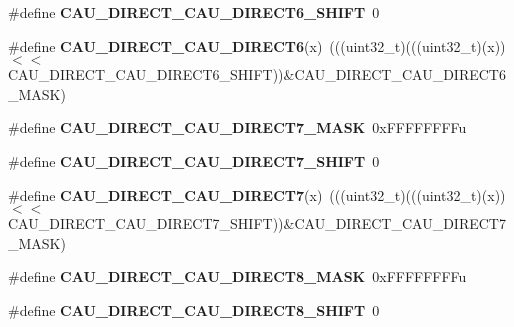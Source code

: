 \begin{DoxyCompactItemize}
\item 
\#define {\bfseries C\+A\+U\+\_\+\+D\+I\+R\+E\+C\+T\+\_\+\+C\+A\+U\+\_\+\+D\+I\+R\+E\+C\+T6\+\_\+\+S\+H\+I\+FT}~0\hypertarget{group__CAU__Register__Masks_ga4dea5b62b401604587b9fa6ed0d98f65}{}\label{group__CAU__Register__Masks_ga4dea5b62b401604587b9fa6ed0d98f65}

\item 
\#define {\bfseries C\+A\+U\+\_\+\+D\+I\+R\+E\+C\+T\+\_\+\+C\+A\+U\+\_\+\+D\+I\+R\+E\+C\+T6}(x)~(((uint32\+\_\+t)(((uint32\+\_\+t)(x))$<$$<$C\+A\+U\+\_\+\+D\+I\+R\+E\+C\+T\+\_\+\+C\+A\+U\+\_\+\+D\+I\+R\+E\+C\+T6\+\_\+\+S\+H\+I\+FT))\&C\+A\+U\+\_\+\+D\+I\+R\+E\+C\+T\+\_\+\+C\+A\+U\+\_\+\+D\+I\+R\+E\+C\+T6\+\_\+\+M\+A\+SK)\hypertarget{group__CAU__Register__Masks_gafd7a2e3e43805f32a2af9474502113b6}{}\label{group__CAU__Register__Masks_gafd7a2e3e43805f32a2af9474502113b6}

\item 
\#define {\bfseries C\+A\+U\+\_\+\+D\+I\+R\+E\+C\+T\+\_\+\+C\+A\+U\+\_\+\+D\+I\+R\+E\+C\+T7\+\_\+\+M\+A\+SK}~0x\+F\+F\+F\+F\+F\+F\+F\+Fu\hypertarget{group__CAU__Register__Masks_gab06d5ca76014069c1511818f08442a16}{}\label{group__CAU__Register__Masks_gab06d5ca76014069c1511818f08442a16}

\item 
\#define {\bfseries C\+A\+U\+\_\+\+D\+I\+R\+E\+C\+T\+\_\+\+C\+A\+U\+\_\+\+D\+I\+R\+E\+C\+T7\+\_\+\+S\+H\+I\+FT}~0\hypertarget{group__CAU__Register__Masks_ga779a3fffe17b85f4298a9d6b2265d543}{}\label{group__CAU__Register__Masks_ga779a3fffe17b85f4298a9d6b2265d543}

\item 
\#define {\bfseries C\+A\+U\+\_\+\+D\+I\+R\+E\+C\+T\+\_\+\+C\+A\+U\+\_\+\+D\+I\+R\+E\+C\+T7}(x)~(((uint32\+\_\+t)(((uint32\+\_\+t)(x))$<$$<$C\+A\+U\+\_\+\+D\+I\+R\+E\+C\+T\+\_\+\+C\+A\+U\+\_\+\+D\+I\+R\+E\+C\+T7\+\_\+\+S\+H\+I\+FT))\&C\+A\+U\+\_\+\+D\+I\+R\+E\+C\+T\+\_\+\+C\+A\+U\+\_\+\+D\+I\+R\+E\+C\+T7\+\_\+\+M\+A\+SK)\hypertarget{group__CAU__Register__Masks_ga6d1edd9596946b0957b74d8d8e0316f0}{}\label{group__CAU__Register__Masks_ga6d1edd9596946b0957b74d8d8e0316f0}

\item 
\#define {\bfseries C\+A\+U\+\_\+\+D\+I\+R\+E\+C\+T\+\_\+\+C\+A\+U\+\_\+\+D\+I\+R\+E\+C\+T8\+\_\+\+M\+A\+SK}~0x\+F\+F\+F\+F\+F\+F\+F\+Fu\hypertarget{group__CAU__Register__Masks_ga8999b171027ec70233192fd566cdd6fd}{}\label{group__CAU__Register__Masks_ga8999b171027ec70233192fd566cdd6fd}

\item 
\#define {\bfseries C\+A\+U\+\_\+\+D\+I\+R\+E\+C\+T\+\_\+\+C\+A\+U\+\_\+\+D\+I\+R\+E\+C\+T8\+\_\+\+S\+H\+I\+FT}~0\hypertarget{group__CAU__Register__Masks_gaae1fbd7c8c40fd07e3928b29d1dcfd0b}{}\label{group__CAU__Register__Masks_gaae1fbd7c8c40fd07e3928b29d1dcfd0b}


\end{DoxyCompactItemize}
